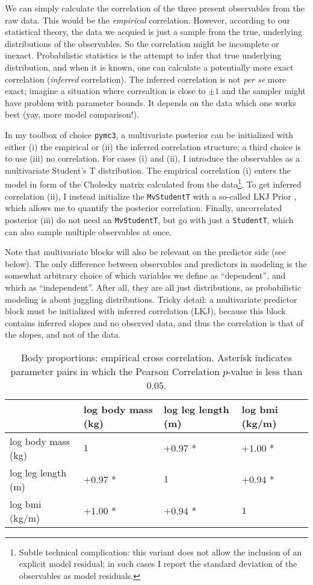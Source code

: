 We can simply calculate the correlation of the three present observables from the raw data.
This would be the \emph{empirical} correlation.
However, according to our statistical theory, the data we acquied is just a sample from the true, underlying distributions of the observables.
So the correlation might be incomplete or inexact.
Probabilistic statistics is the attempt to infer that true underlying distribution, and when it is known, one can calculate a potentially more exact correlation (\emph{inferred} correlation).
The inferred correlation is not \emph{per se} more exact; imagine a situation where correaltion is close to \(\pm 1\) and the sampler might have problem with parameter bounds.
It depends on the data which one works best (yay, more model comparison!).


In my toolbox of choice \texttt{pymc3}, a multivariate posterior can be initialized with either (i) the empirical or (ii) the inferred correlation structure; a third choice is to use (iii) no correlation.
For cases (i) and (ii), I introduce the observables as a multivariate Student's T distribution.
The empirical correlation (i) enters the model in form of the Cholesky matrix calculated from the data\footnote{Subtle technical complication: this variant does not allow the inclusion of an explicit model residual; in such cases I report the standard deviation of the observables as model residuals.}.
To get inferred correlation (ii), I instead initialize the \texttt{MvStudentT} with a so-called LKJ Prior \citep{LKJ2009}, which allows me to quantify the posterior correlation.
Finally, uncorrelated posterior (iii) do not need an \texttt{MvStudentT}, but go with just a \texttt{StudentT}, which can also sample multiple observables at once.

Note that multivariate blocks will also be relevant on the predictor side (see below).
The only difference between observables and predictors in modeling is the somewhat arbitrary choice of which variables we define as ``dependent'', and which as ``independent''.
After all, they are all just distributions, as probabilistic modeling is about juggling distributions.
Tricky detail: a multivariate predictor block must be initialized with inferred correlation (LKJ), because this block contains inferred slopes and no observed data, and thus the correlation is that of the slopes, and not of the data.


\begin{table}[htbp]
\caption{\label{tab:proportions_empiricalcorrelation}Body proportions: empirical cross correlation. Asterisk indicates parameter pairs in which the Pearson Correlation \(p\)-value is less than \(0.05\).}
\centering
\begin{tabular}{llll}
 & log body mass (kg) & log leg length (m) & log bmi (kg/m)\\[0pt]
\hline
log body mass (kg) & \(1\) & \(+0.97\) * & \(+1.00\) *\\[0pt]
log leg length (m) & \(+0.97\) * & \(1\) & \(+0.94\) *\\[0pt]
log bmi (kg/m) & \(+1.00\) * & \(+0.94\) * & \(1\)\\[0pt]
\end{tabular}
\end{table}

